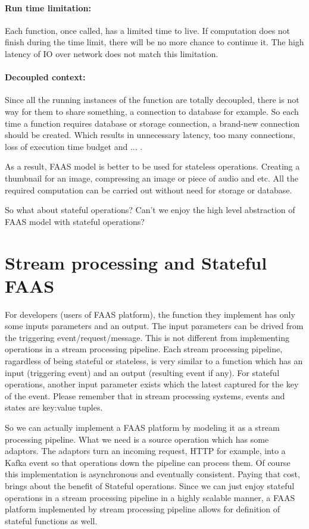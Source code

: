 \documentclass[a4]{report}
\begin{document}
    \paragraph{Run time limitation:} Each function, once called, has a limited time to live.
    If computation does not finish during the time limit, there will be no more chance to continue it.
    The high latency of IO over network does not match this limitation.

    \paragraph{Decoupled context:} Since all the running instances of the function are totally decoupled, there is
    not way for them to share something, a connection to database for example.
    So each time a function requires database or storage connection, a brand-new connection should be created.
    Which results in unnecessary latency, too many connections, loss of execution time budget and ... .

    As a result, FAAS model is better to be used for stateless operations.
    Creating a thumbnail for an image, compressing an image or piece of audio and etc.
    All the required computation can be carried out without need for storage or database.

    So what about stateful operations?
    Can't we enjoy the high level abstraction of FAAS model with stateful operations?

    \section{Stream processing and Stateful FAAS}
    For developers (users of FAAS platform), the function they implement has only some inputs parameters and an output.
    The input parameters can be drived from the triggering event/request/message.
    This is not different from implementing operations in a stream processing pipeline.
    Each stream processing pipeline, ragardless of being stateful or stateless, is very similar to a function which
    has an input (triggering event) and an output (resulting event if any).
    For stateful operations, another input parameter exists which the latest captured for the key of the event.
    Please remember that in stream processing systems, events and states are key:value tuples.

    So we can actually implement a FAAS platform by modeling it as a stream processing pipeline.
    What we need is a source operation which has some adaptors.
    The adaptors turn an incoming request, HTTP for example, into a Kafka event so that operations down the pipeline
    can process them.
    Of course this implementation is asynchronous and eventually consistent.
    Paying that cost, brings about the benefit of Stateful operations.
    Since we can just enjoy stateful operations in a stream processing pipeline in a highly scalable manner,
    a FAAS platform implemented by stream processing pipeline allows for definition of stateful functions as well.
\end{document}
